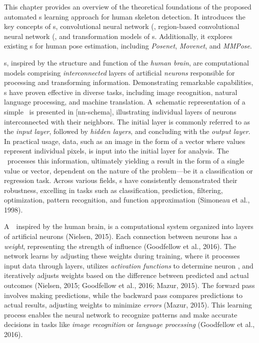 This chapter provides an overview of the theoretical foundations of the proposed automated \NN\-s learning approach for human skeleton detection. It introduces the key concepts of \NN\-s, convolutional neural network  (\CNN\), region-based convolutional neural network  (\RCNN\), and transformation models of \NN\-s. Additionally, it explores existing \NN\-s for human pose estimation, including {\em Posenet}, {\em Movenet}, and {\em MMPose}.

\NN\-s, inspired by the structure and function of the {\em human brain}, are computational models comprising {\em interconnected} layers of artificial {\em neurons} responsible for processing and transforming information. Demonstrating remarkable capabilities, \NN\-s have proven effective in diverse tasks, including image recognition, natural language processing, and machine translation. A~schematic representation of a simple \NN\ is presented in [nn-schema], illustrating individual layers of neurons interconnected with their neighbors. The initial layer is commonly referred to as the {\em input layer}, followed by {\em hidden layers}, and concluding with the {\em output layer}. In practical usage, data, such as an image in the form of a vector where values represent individual pixels, is input into the initial layer for analysis. The \NN\ processes this information, ultimately yielding a result in the form of a single value or vector, dependent on the nature of the problem—be it a classification or regression task. Across various fields, \NN\-s have consistently demonstrated their robustness, excelling in tasks such as classification, prediction, filtering, optimization, pattern recognition, and function approximation (\scc Simoneau et al., 1998).


A~\NN\, inspired by the human brain, is a computational system organized into layers of artificial neurons (\scc Nielsen, 2015). Each connection between neurons has a {\em weight}, representing the strength of influence (\scc Goodfellow et al., 2016). The network learns by adjusting these weights during training, where it processes input data through layers, utilizes {\em activation functions} to determine neuron , and iteratively adjusts weights based on the difference between predicted and actual outcomes (\scc Nielsen, 2015; \scc Goodfellow et al., 2016; \scc Mazur, 2015). The forward pass involves making predictions, while the backward pass compares predictions to actual results, adjusting weights to minimize {\em errors} (\scc Mazur, 2015). This learning process enables the neural network to recognize patterns and make accurate decisions in tasks like {\em image recognition} or {\em language processing} (\scc Goodfellow et al., 2016).

